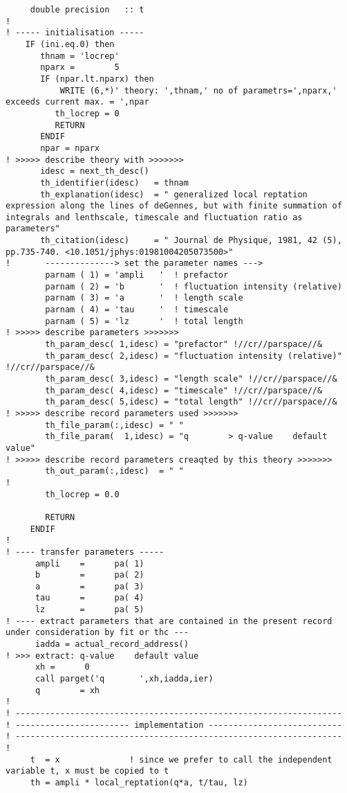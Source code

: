 \documentclass{article}
\begin{document}
\begin{verbatim}
     double precision   :: t
!
! ----- initialisation ----- 
    IF (ini.eq.0) then     
       thnam = 'locrep'
       nparx =        5
       IF (npar.lt.nparx) then
           WRITE (6,*)' theory: ',thnam,' no of parametrs=',nparx,' exceeds current max. = ',npar
          th_locrep = 0
          RETURN
       ENDIF
       npar = nparx
! >>>>> describe theory with >>>>>>> 
       idesc = next_th_desc()
       th_identifier(idesc)   = thnam
       th_explanation(idesc)  = " generalized local reptation expression along the lines of deGennes, but with finite summation of integrals and lenthscale, timescale and fluctuation ratio as parameters"
       th_citation(idesc)     = " Journal de Physique, 1981, 42 (5), pp.735-740. <10.1051/jphys:01981004205073500>"
!       --------------> set the parameter names --->
        parnam ( 1) = 'ampli   '  ! prefactor                                                                       
        parnam ( 2) = 'b       '  ! fluctuation intensity (relative)                                                
        parnam ( 3) = 'a       '  ! length scale                                                                    
        parnam ( 4) = 'tau     '  ! timescale                                                                       
        parnam ( 5) = 'lz      '  ! total length                                                                    
! >>>>> describe parameters >>>>>>> 
        th_param_desc( 1,idesc) = "prefactor" !//cr//parspace//&
        th_param_desc( 2,idesc) = "fluctuation intensity (relative)" !//cr//parspace//&
        th_param_desc( 3,idesc) = "length scale" !//cr//parspace//&
        th_param_desc( 4,idesc) = "timescale" !//cr//parspace//&
        th_param_desc( 5,idesc) = "total length" !//cr//parspace//&
! >>>>> describe record parameters used >>>>>>>
        th_file_param(:,idesc) = " " 
        th_file_param(  1,idesc) = "q        > q-value    default value"
! >>>>> describe record parameters creaqted by this theory >>>>>>> 
        th_out_param(:,idesc)  = " "
! 
        th_locrep = 0.0
 
        RETURN
     ENDIF
!
! ---- transfer parameters -----
      ampli    =      pa( 1)
      b        =      pa( 2)
      a        =      pa( 3)
      tau      =      pa( 4)
      lz       =      pa( 5)
! ---- extract parameters that are contained in the present record under consideration by fit or thc ---
      iadda = actual_record_address()
! >>> extract: q-value    default value
      xh =      0
      call parget('q       ',xh,iadda,ier)
      q        = xh
! 
! ------------------------------------------------------------------
! ----------------------- implementation ---------------------------
! ------------------------------------------------------------------
! 
     t  = x              ! since we prefer to call the independent variable t, x must be copied to t
     th = ampli * local_reptation(q*a, t/tau, lz)


\end{verbatim}
\end{document}
